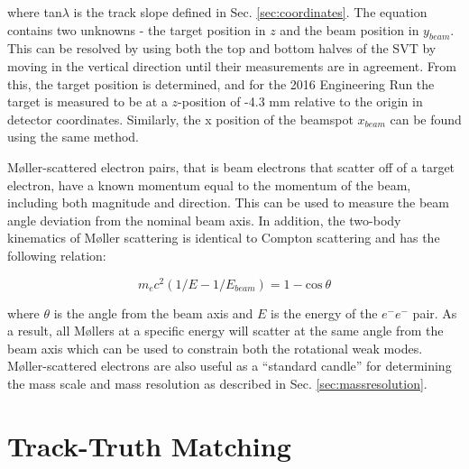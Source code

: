where tan$\lambda$ is the track slope defined in Sec. \ref{sec:coordinates}. The equation contains two unknowns - the target position in $z$ and the beam position in $y_{beam}$. This can be resolved by using both the top and bottom halves of the SVT by moving in the vertical direction until their measurements are in agreement. From this, the target position is determined, and for the 2016 Engineering Run the target is measured to be at a $z$-position of -4.3 mm relative to the origin in detector coordinates. Similarly, the x position of the beamspot $x_{beam}$ can be found using the same method. %

M\o ller-scattered electron pairs, that is beam electrons that scatter off of a target electron, have a known momentum equal to the momentum of the beam, including both magnitude and direction. This can be used to measure the beam angle deviation from the nominal beam axis. In addition, the two-body kinematics of M\o ller scattering is identical to Compton scattering and has the following relation:

\begin{equation}
    m_ec^2 \left( 1/E - 1/E_{beam} \right) = 1 - \mathrm{cos} \ \theta
    \label{eqn:moller}
\end{equation}

where $\theta$ is the angle from the beam axis and $E$ is the energy of the $e^-e^-$ pair. As a result, all M\o llers at a specific energy will scatter at the same angle from the beam axis which can be used to constrain both the rotational weak modes. M\o ller-scattered electrons are also useful as a ``standard candle'' for determining the mass scale and mass resolution as described in Sec. \ref{sec:massresolution}.

\clearpage

\section{Track-Truth Matching}\label{sec:tracktruth}

